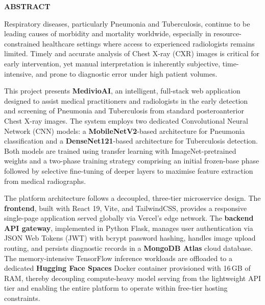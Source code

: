 \documentclass[12pt, a4paper, oneside]{report}
\begin{document}

\newpage
{}
\begin{center}
{\Large \textbf{ABSTRACT}}\\[1cm]
\end{center}

\singlespacing

Respiratory diseases, particularly Pneumonia and Tuberculosis, continue to be leading causes of morbidity and mortality worldwide, especially in resource-constrained healthcare settings where access to experienced radiologists remains limited. Timely and accurate analysis of Chest X-ray (CXR) images is critical for early intervention, yet manual interpretation is inherently subjective, time-intensive, and prone to diagnostic error under high patient volumes.

This project presents \textbf{MedivioAI}, an intelligent, full-stack web application designed to assist medical practitioners and radiologists in the early detection and screening of Pneumonia and Tuberculosis from standard posteroanterior Chest X-ray images. The system employs two dedicated Convolutional Neural Network (CNN) models: a \textbf{MobileNetV2}-based architecture for Pneumonia classification and a \textbf{DenseNet121}-based architecture for Tuberculosis detection. Both models are trained using transfer learning with ImageNet-pretrained weights and a two-phase training strategy comprising an initial frozen-base phase followed by selective fine-tuning of deeper layers to maximise feature extraction from medical radiographs.

The platform architecture follows a decoupled, three-tier microservice design. The \textbf{frontend}, built with React 19, Vite, and TailwindCSS, provides a responsive single-page application served globally via Vercel's edge network. The \textbf{backend API gateway}, implemented in Python Flask, manages user authentication via JSON Web Tokens (JWT) with bcrypt password hashing, handles image upload routing, and persists diagnostic records in a \textbf{MongoDB Atlas} cloud database. The memory-intensive TensorFlow inference workloads are offloaded to a dedicated \textbf{Hugging Face Spaces} Docker container provisioned with 16\,GB of RAM, thereby decoupling compute-heavy model serving from the lightweight API tier and enabling the entire platform to operate within free-tier hosting constraints.
\end{document}

